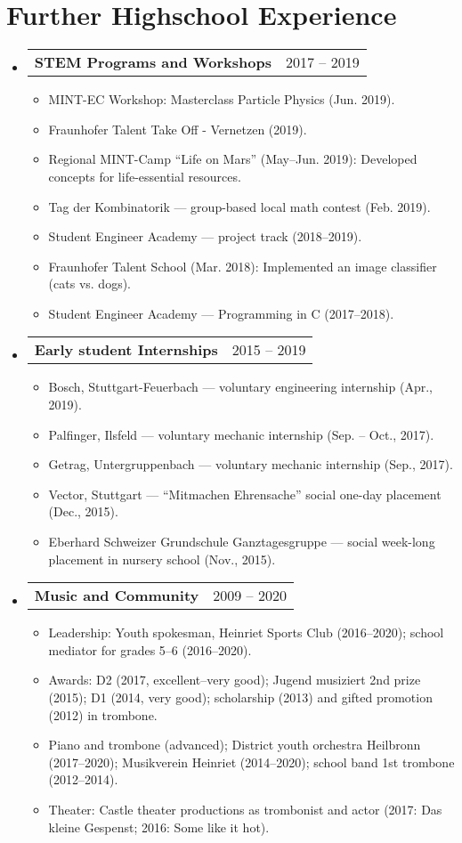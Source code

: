 \documentclass[letterpaper,11pt]{article}
\makeatletter
\newcommand{\resumeItem}[1]{
  \item\small{
    {#1 \vspace{-2pt}}
  }
}
\newcommand{\resumeProjectHeading}[2]{
    \item
    \begin{tabular*}{0.97\textwidth}{l@{\extracolsep{\fill}}r}
      \small#1 & #2 \\
    \end{tabular*}\vspace{-7pt}
}
\newcommand{\resumeSubHeadingListStart}{\begin{itemize}[leftmargin=0.15in, label={}]}
\newcommand{\resumeSubHeadingListEnd}{\end{itemize}}
\newcommand{\resumeItemListStart}{\begin{itemize}}
\newcommand{\resumeItemListEnd}{\end{itemize}\vspace{-5pt}}
\makeatother
\begin{document}
  \section{Further Highschool Experience}
    \resumeSubHeadingListStart
      \resumeProjectHeading
          {\textbf{STEM Programs and Workshops}}{2017 -- 2019}
          \resumeItemListStart
            \resumeItem{MINT-EC Workshop: Masterclass Particle Physics (Jun. 2019).}
            \resumeItem{Fraunhofer Talent Take Off - Vernetzen (2019).}
            \resumeItem{Regional MINT-Camp “Life on Mars” (May--Jun. 2019): Developed concepts for life-essential resources.}
            \resumeItem{Tag der Kombinatorik — group-based local math contest (Feb. 2019).}
            \resumeItem{Student Engineer Academy — project track (2018--2019).}
            \resumeItem{Fraunhofer Talent School (Mar. 2018): Implemented an image classifier (cats vs. dogs).}
            \resumeItem{Student Engineer Academy — Programming in C (2017--2018).}
          \resumeItemListEnd
      \resumeProjectHeading
          {\textbf{Early student Internships}}{2015 -- 2019}
          \resumeItemListStart
            \resumeItem{Bosch, Stuttgart-Feuerbach — voluntary engineering internship (Apr., 2019).}
            \resumeItem{Palfinger, Ilsfeld — voluntary mechanic internship (Sep. -- Oct., 2017).}
            \resumeItem{Getrag, Untergruppenbach — voluntary mechanic internship (Sep., 2017).}
            \resumeItem{Vector, Stuttgart — “Mitmachen Ehrensache” social one-day placement (Dec., 2015).}
            \resumeItem{Eberhard Schweizer Grundschule Ganztagesgruppe — social week-long placement in nursery school (Nov., 2015).}
          \resumeItemListEnd
      \resumeProjectHeading
            {\textbf{Music and Community}}{2009 -- 2020}
            \resumeItemListStart
            \resumeItem{Leadership: Youth spokesman, Heinriet Sports Club (2016--2020); school mediator for grades 5--6 (2016--2020).}
            \resumeItem{Awards: D2 (2017, excellent--very good); Jugend musiziert 2nd prize (2015); D1 (2014, very good); scholarship (2013) and gifted promotion (2012) in trombone.}
            \resumeItem{Piano and trombone (advanced); District youth orchestra Heilbronn (2017--2020); Musikverein Heinriet (2014--2020); school band 1st trombone (2012--2014).}
            \resumeItem{Theater: Castle theater productions as trombonist and actor (2017: Das kleine Gespenst; 2016: Some like it hot).}
            \resumeItemListEnd

    \resumeSubHeadingListEnd
\end{document}
